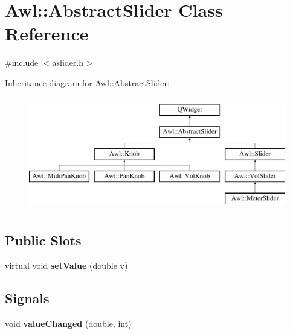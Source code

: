\hypertarget{class_awl_1_1_abstract_slider}{}\section{Awl\+:\+:Abstract\+Slider Class Reference}
\label{class_awl_1_1_abstract_slider}


{\ttfamily \#include $<$aslider.\+h$>$}

Inheritance diagram for Awl\+:\+:Abstract\+Slider\+:\begin{figure}[H]
\begin{center}
\leavevmode
\includegraphics[height=5.000000cm]{class_awl_1_1_abstract_slider}
\end{center}
\end{figure}
\subsection*{Public Slots}
\begin{DoxyCompactItemize}
\item 
\mbox{\label{class_awl_1_1_abstract_slider_ad7e1418923b13d85524e6ce05bdf3b9a}} 
virtual void {\bfseries set\+Value} (double v)
\end{DoxyCompactItemize}
\subsection*{Signals}
\begin{DoxyCompactItemize}
\item 
\mbox{\label{class_awl_1_1_abstract_slider_a68757e58e22f9f4572ed7b142532486a}} 
void {\bfseries value\+Changed} (double, int)
\end{DoxyCompactItemize}
